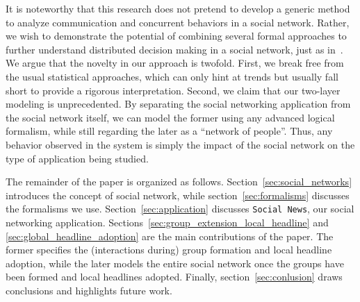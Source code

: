 It is noteworthy that this research does not pretend to develop a generic method to analyze communication and concurrent
behaviors in a social network. Rather, we wish to demonstrate the potential of combining several formal approaches to
further understand distributed decision making in a social network, just as in~\cite{He-Yuan-Zeng:07}. We argue that the
novelty in our approach is twofold. First, we break free from the usual statistical approaches, which can only hint at
trends but usually fall short to provide a rigorous interpretation. Second, we claim that our two-layer modeling is
unprecedented. By separating the social networking application from the social network itself, we can model the former
using any advanced logical formalism, while still regarding the later as a ``network of people''. Thus, any behavior
observed in the system is simply the impact of the social network on the type of application being studied.

The remainder of the paper is organized as follows. Section~\ref{sec:social_networks} introduces the concept of social network, while
section~\ref{sec:formalisms} discusses the formalisms we use. Section~\ref{sec:application} discusses {\tt Social News}, our social networking application.
Sections~\ref{sec:group_extension_local_headline} and \ref{sec:global_headline_adoption} are the main contributions of the paper. The former specifies the
(interactions during) group formation and local headline adoption, while the later models the entire social network once the groups have been formed and
local headlines adopted. Finally, section~\ref{sec:conlusion} draws conclusions and highlights future work.

